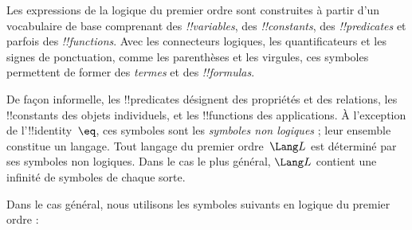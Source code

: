 \documentclass[../../../include/open-logic-section]{subfiles}
\begin{document}


Les expressions de la logique du premier ordre sont construites à
partir d'un vocabulaire de base comprenant des \emph{!!{variable}s},
des \emph{!!{constant}s}, des \emph{!!{predicate}s} et parfois des
\emph{!!{function}s}. Avec les connecteurs logiques, les
quantificateurs et les signes de ponctuation, comme les parenthèses
et les virgules, ces symboles permettent de former des \emph{termes}
et des \emph{!!{formula}s}.

\begin{explain}
De façon informelle, les !!{predicate}s désignent des propriétés et
des relations, les !!{constant}s des objets individuels, et les
!!{function}s des applications. À l'exception de l'!!{identity}~$\eq$,
ces symboles sont les \emph{symboles non logiques} ; leur ensemble
constitue un langage. Tout langage du premier ordre~$\Lang L$ est
déterminé par ses symboles non logiques. Dans le cas le plus général,
$\Lang L$ contient une infinité de symboles de chaque sorte.
\end{explain}

Dans le cas général, nous utilisons les symboles suivants en logique
du premier ordre :
\end{document}
